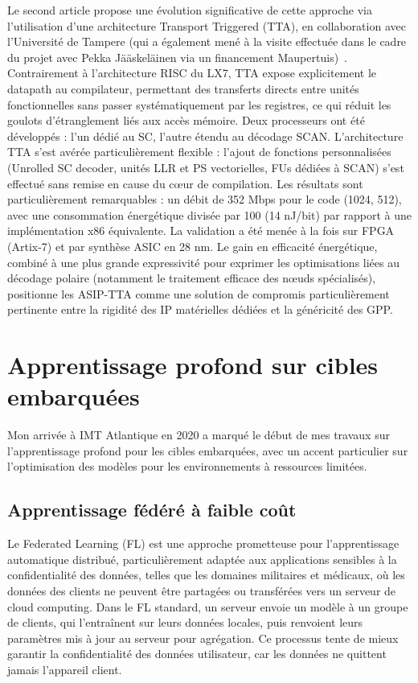 \documentclass[11pt]{report}
\begin{document}
Le second article propose une évolution significative de cette approche via l'utilisation d'une architecture Transport Triggered (TTA), en collaboration avec l'Université de Tampere (qui a également mené à la visite effectuée dans le cadre du projet avec Pekka Jääskeläinen via un financement Maupertuis)~\cite{leonardon:hal-01978830}. Contrairement à l'architecture RISC du LX7, TTA expose explicitement le datapath au compilateur, permettant des transferts directs entre unités fonctionnelles sans passer systématiquement par les registres, ce qui réduit les goulots d'étranglement liés aux accès mémoire. Deux processeurs ont été développés : l'un dédié au SC, l'autre étendu au décodage SCAN. L'architecture TTA s'est avérée particulièrement flexible : l'ajout de fonctions personnalisées (Unrolled SC decoder, unités LLR et PS vectorielles, FUs dédiées à SCAN) s'est effectué sans remise en cause du cœur de compilation. Les résultats sont particulièrement remarquables : un débit de 352 Mbps pour le code (1024, 512), avec une consommation énergétique divisée par 100 (14 nJ/bit) par rapport à une implémentation x86 équivalente. La validation a été menée à la fois sur FPGA (Artix-7) et par synthèse ASIC en 28 nm. Le gain en efficacité énergétique, combiné à une plus grande expressivité pour exprimer les optimisations liées au décodage polaire (notamment le traitement efficace des nœuds spécialisés), positionne les ASIP-TTA comme une solution de compromis particulièrement pertinente entre la rigidité des IP matérielles dédiées et la généricité des GPP.




\section{Apprentissage profond sur cibles embarquées}
\label{sec:deep_learning_embedded}

Mon arrivée à IMT Atlantique en 2020 a marqué le début de mes travaux sur l'apprentissage profond pour les cibles embarquées, avec un accent particulier sur l'optimisation des modèles pour les environnements à ressources limitées.

\subsection{Apprentissage fédéré à faible coût}
Le Federated Learning (FL) est une approche prometteuse pour l'apprentissage automatique distribué, particulièrement adaptée aux applications sensibles à la confidentialité des données, telles que les domaines militaires et médicaux, où les données des clients ne peuvent être partagées ou transférées vers un serveur de cloud computing. Dans le FL standard, un serveur envoie un modèle à un groupe de clients, qui l'entraînent sur leurs données locales, puis renvoient leurs paramètres mis à jour au serveur pour agrégation. Ce processus tente de mieux garantir la confidentialité des données utilisateur, car les données ne quittent jamais l'appareil client.
\end{document}
